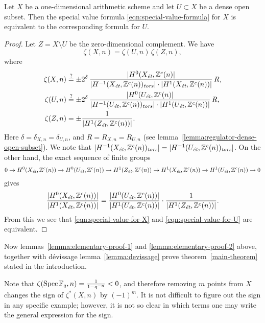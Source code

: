 \documentclass{article}
\numberwithin{equation}{section}
\begin{document}
\begin{lemma}
  \label{lemma:elementary-proof-2}
  Let $X$ be a one-dimensional arithmetic scheme and let $U \subset X$ be a
  dense open subset. Then the special value formula
  \eqref{eqn:special-value-formula} for $X$ is equivalent to the corresponding
  formula for $U$.

  \begin{proof}
    Let $Z = X\setminus U$ be the zero-dimensional complement. We have
    $$\zeta (X,n) = \zeta (U,n)\,\zeta (Z,n),$$
    where
    \begin{align}
      \label{eqn:special-value-for-X} \zeta (X,n) & \stackrel{?}{=} \pm 2^\delta\,\frac{|H^0 (X_\et, \ZZ^c (n)|}{|H^{-1} (X_\et, \ZZ^c (n))_\tors| \cdot |H^1 (X_\et, \ZZ^c (n))|}\,R, \\
      \label{eqn:special-value-for-U} \zeta (U,n) & \stackrel{?}{=} \pm 2^\delta\,\frac{|H^0 (U_\et, \ZZ^c (n)|}{|H^{-1} (U_\et, \ZZ^c (n))_\tors| \cdot |H^1 (U_\et, \ZZ^c (n))|}\,R, \\
      \notag \zeta (Z,n) & = \pm\frac{1}{|H^1 (Z_\et, \ZZ^c (n))|}.
    \end{align}
    Here $\delta = \delta_{X,n} = \delta_{U,n}$, and $R = R_{X,n} = R_{U,n}$
    (see lemma~\ref{lemma:regulator-dense-open-subset}). We note that
    $|H^{-1} (X_\et, \ZZ^c (n))_\tors| = |H^{-1} (U_\et, \ZZ^c (n))_\tors|$.
    On the other hand, the exact sequence of finite groups
    \[ 0 \to H^0 (X_\et, \ZZ^c (n)) \to
      H^0 (U_\et, \ZZ^c (n)) \to
      H^1 (Z_\et, \ZZ^c (n)) \to
      H^1 (X_\et, \ZZ^c (n)) \to
      H^1 (U_\et, \ZZ^c (n)) \to 0 \]
    gives
    \[ \frac{|H^0 (X_\et, \ZZ^c (n))|}{|H^1 (X_\et, \ZZ^c (n))|} =
      \frac{|H^0 (U_\et, \ZZ^c (n))|}{|H^1 (U_\et, \ZZ^c (n))|}\cdot
      \frac{1}{|H^1 (Z_\et, \ZZ^c (n))|}. \]
    From this we see that \eqref{eqn:special-value-for-X} and
    \eqref{eqn:special-value-for-U} are equivalent.
  \end{proof}
\end{lemma}

Now lemmas~\ref{lemma:elementary-proof-1} and \ref{lemma:elementary-proof-2}
above, together with dévissage lemma~\ref{lemma:devissage} prove
theorem~\ref{main-theorem} stated in the introduction.

\begin{remark}
  Note that $\zeta (\Spec \FF_q, n) = \frac{1}{1 - q^{-n}} < 0$, and therefore
  removing $m$ points from $X$ changes the sign of $\zeta^* (X,n)$ by
  $(-1)^m$. It is not difficult to figure out the sign in any specific example;
  however, it is not so clear in which terms one may write the general
  expression for the sign.
\end{remark}
\end{document}
